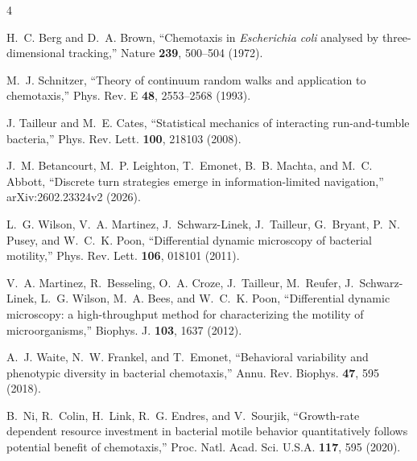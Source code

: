 \documentclass[
  reprint,
  superscriptaddress,
  amsmath,
  amssymb,
  aps,
  pre,
  nofootinbib,
  floatfix
]{revtex4-2}
\begin{document}
\begin{thebibliography}{4}

H.~C. Berg and D.~A. Brown,
``Chemotaxis in \textit{Escherichia coli} analysed by three-dimensional
tracking,'' Nature \textbf{239}, 500--504 (1972).

M.~J. Schnitzer,
``Theory of continuum random walks and application to chemotaxis,''
Phys. Rev. E \textbf{48}, 2553--2568 (1993).

J. Tailleur and M.~E. Cates,
``Statistical mechanics of interacting run-and-tumble bacteria,''
Phys. Rev. Lett. \textbf{100}, 218103 (2008).

J.~M. Betancourt, M.~P. Leighton, T.~Emonet, B.~B. Machta, and M.~C. Abbott,
``Discrete turn strategies emerge in information-limited navigation,''
arXiv:2602.23324v2 (2026).

L.~G. Wilson, V.~A. Martinez, J.~Schwarz-Linek, J.~Tailleur, G.~Bryant,
P.~N. Pusey, and W.~C.~K. Poon,
``Differential dynamic microscopy of bacterial motility,''
Phys. Rev. Lett. \textbf{106}, 018101 (2011).

V.~A. Martinez, R.~Besseling, O.~A. Croze, J.~Tailleur, M.~Reufer,
J.~Schwarz-Linek, L.~G. Wilson, M.~A. Bees, and W.~C.~K. Poon,
``Differential dynamic microscopy: a high-throughput method for characterizing
the motility of microorganisms,''
Biophys. J. \textbf{103}, 1637 (2012).

A.~J. Waite, N.~W. Frankel, and T.~Emonet,
``Behavioral variability and phenotypic diversity in bacterial chemotaxis,''
Annu. Rev. Biophys. \textbf{47}, 595 (2018).

B.~Ni, R.~Colin, H.~Link, R.~G. Endres, and V.~Sourjik,
``Growth-rate dependent resource investment in bacterial motile behavior
quantitatively follows potential benefit of chemotaxis,''
Proc. Natl. Acad. Sci. U.S.A. \textbf{117}, 595 (2020).

\end{thebibliography}
\end{document}
